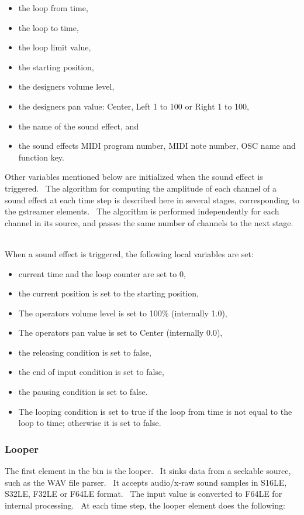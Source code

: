 \documentclass[letterpaper]{article}
\newcommand\liststyleLviii{%
\renewcommand\labelitemi{•}
\renewcommand\labelitemii{◦}
\renewcommand\labelitemiii{${\blacksquare}$}
\renewcommand\labelitemiv{•}
}
\newcommand\liststyleLix{%
\renewcommand\labelitemi{•}
\renewcommand\labelitemii{◦}
\renewcommand\labelitemiii{${\blacksquare}$}
\renewcommand\labelitemiv{•}
}
\begin{document}
\liststyleLviii
\begin{itemize}
\item the loop from time, 
\item the loop to time, 
\item the loop limit value, 
\item the starting position,
\item the designer{\textquotesingle}s volume level,
\item the designer{\textquotesingle}s pan value: Center, Left 1 to 100
or Right 1 to 100,
\item the name of the sound effect, and
\item the sound effect{\textquotesingle}s MIDI program number, MIDI note
number, OSC name and function key.
\end{itemize}
Other variables mentioned below are initialized when the sound effect is
triggered. \ The algorithm for computing the amplitude of each channel
of a sound effect at each time step is described here in several
stages, corresponding to the gstreamer elements. \ The algorithm is
performed independently for each channel in its source, and passes the
same number of channels to the next stage. \ 

When a sound effect is triggered, the following local variables are set:

\liststyleLix
\begin{itemize}
\item current time and the loop counter are set to 0,
\item the current position is set to the starting position,
\item The operator{\textquotesingle}s volume level is set to 100\%
(internally 1.0),
\item The operator{\textquotesingle}s pan value is set to Center
(internally 0.0),
\item the releasing condition is set to false,
\item the end of input condition is set to false,
\item the pausing condition is set to false.
\item The looping condition is set to true if the loop from time is not
equal to the loop to time; otherwise it is set to false.
\end{itemize}
\subsubsection[Looper]{Looper}
The first element in the bin is the looper. \ It sinks data from a
seekable source, such as the WAV file parser. \ It accepts audio/x-raw
sound samples in S16LE, S32LE, F32LE or F64LE format. \ The input value
is converted to F64LE for internal processing. \ At each time step, the
looper element does the following:
\end{document}
